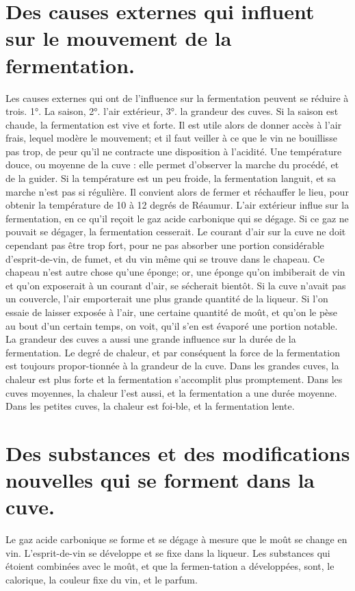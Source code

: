 \section{Des causes externes qui influent sur le mouvement de la fermentation.}
Les causes externes qui ont de l'influence sur la fermentation peuvent se réduire à trois. 1°. La saison, 2°. l'air extérieur, 3°. la grandeur des cuves.
Si la saison est chaude, la fermentation est vive et forte. Il est utile alors de donner accès à l'air frais, lequel modère le mouvement; et il faut veiller à ce que le vin ne bouillisse pas trop, de peur qu'il ne contracte une disposition à l'acidité. Une température douce, ou moyenne\setcounter{page}{140} de la cuve : elle permet d'observer la marche du procédé, et de la guider.
Si la température est un peu froide, la fermentation languit, et sa marche n'est pas si régulière. Il convient alors de fermer et réchauffer le lieu, pour obtenir la température de 10 à 12 degrés de Réaumur.
L'air extérieur influe sur la fermentation, en ce qu'il reçoit le gaz acide carbonique qui se dégage. Si ce gaz ne pouvait se dégager, la fermentation cesserait. Le courant d'air sur la cuve ne doit cependant pas être trop fort, pour ne pas absorber une portion considérable d'esprit-de-vin, de fumet, et du vin même qui se trouve dans le chapeau.
Ce chapeau n'est autre chose qu'une éponge; or, une éponge qu'on imbiberait de vin et qu'on exposerait à un courant d'air, se sécherait bientôt.
Si la cuve n'avait pas un couvercle, l'air emporterait une plus grande quantité de la liqueur. Si l'on essaie de laisser exposée à l'air, une certaine quantité de moût, et qu'on le pèse au bout d'un certain temps, on voit, qu'il s'en est évaporé une portion notable.
La grandeur des cuves a aussi une grande influence sur la durée de la fermentation.
Le degré de chaleur, et par conséquent la\setcounter{page}{141} force de la fermentation est toujours propor-tionnée à la grandeur de la cuve.
Dans les grandes cuves, la chaleur est plus forte et la fermentation s’accomplit plus promptement.
Dans les cuves moyennes, la chaleur l’est aussi, et la fermentation a une durée moyenne.
Dans les petites cuves, la chaleur est foi-ble, et la fermentation lente.
\section{Des substances et des modifications nouvelles qui se forment dans la cuve.}
Le gaz acide carbonique se forme et se dégage à mesure que le moût se change en vin. L’esprit-de-vin se développe et se fixe dans la liqueur. Les substances qui étoient combinées avec le moût, et que la fermen-tation a développées, sont, le calorique, la couleur fixe du vin, et le parfum.
